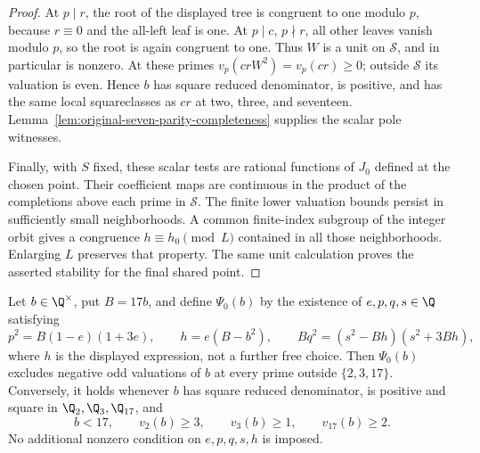 \begin{proof}
At $p\mid r$, the root of the displayed tree is congruent to one
modulo $p$, because $r\equiv0$ and the all-left leaf is one.
At $p\mid c$, $p\nmid r$, all other leaves vanish modulo $p$,
so the root is again congruent to one. Thus $W$ is a unit on
$\mathcal S$, and in particular is nonzero. At these primes
$v_p(crW^2)=v_p(cr)\ge0$; outside $\mathcal S$ its valuation is
even. Hence $b$ has square reduced denominator, is positive, and
has the same local squareclasses as $cr$ at two, three, and
seventeen. Lemma~\ref{lem:original-seven-parity-completeness}
supplies the scalar pole witnesses.

Finally, with $S$ fixed, these scalar tests are rational functions
of $J_0$ defined at the chosen point. Their coefficient maps are
continuous in the product of the completions above each prime in
$\mathcal S$. The finite lower valuation bounds persist in
sufficiently small neighborhoods. A common finite-index subgroup
of the integer orbit gives a congruence $h\equiv h_0\pmod L$
contained in all those neighborhoods. Enlarging $L$ preserves
that property. The same unit calculation proves the asserted
stability for the final shared point.
\end{proof}

\begin{lemma}
\label{v5:preparation-zero-bridge}
Let $b\in\Q^\times$, put $B=17b$, and define $\Psi_0(b)$ by
the existence of $e,p,q,s\in\Q$ satisfying
\[
 p^2=B(1-e)(1+3e),\qquad h=e(B-b^2),\qquad
 Bq^2=(s^2-Bh)(s^2+3Bh),
\]
where $h$ is the displayed expression, not a further free choice.
Then $\Psi_0(b)$ excludes negative odd valuations of $b$ at every
prime outside $\{2,3,17\}$. Conversely, it holds whenever $b$ has
square reduced denominator, is positive and square in
$\Q_2,\Q_3,\Q_{17}$, and
\[
 b<17,\qquad v_2(b)\ge3,\qquad v_3(b)\ge1,
 \qquad v_{17}(b)\ge2.
\]
No additional nonzero condition on $e,p,q,s,h$ is imposed.
\end{lemma}

